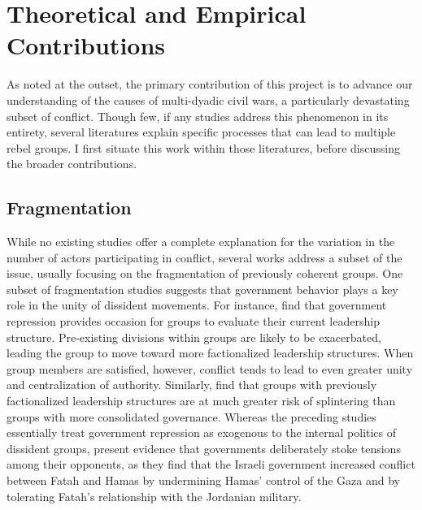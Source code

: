 
\section{Theoretical and Empirical Contributions}

As noted at the outset, the primary contribution of this project is to advance our understanding of the causes of multi-dyadic civil wars, a particularly devastating subset of conflict. Though few, if any studies address this phenomenon in its entirety, several literatures explain specific processes that can lead to multiple rebel groups. I first situate this work within those literatures, before discussing the broader contributions.

\subsection{Fragmentation}

While no existing studies offer a complete explanation for the variation in the number of actors participating in conflict, several works address a subset of the issue, usually focusing on the fragmentation of previously coherent groups. One subset of fragmentation studies suggests that government behavior plays a key role in the unity of dissident movements. For instance, \citet{McLauchlin2012} find that government repression provides occasion for groups to evaluate their current leadership structure. Pre-existing divisions within groups are likely to be exacerbated, leading the group to move toward more factionalized leadership structures. When group members are satisfied, however, conflict tends to lead to even greater unity and centralization of authority. Similarly, \citet{Asal2012} find that groups with previously factionalized leadership structures are at much greater risk of splintering than groups with more consolidated governance. Whereas the preceding studies essentially treat government repression as exogenous to the internal politics of dissident groups, \citet{Bhavnani2011} present evidence that governments deliberately stoke tensions among their opponents, as they find that the Israeli government increased conflict between Fatah and Hamas by undermining Hamas' control of the Gaza and by tolerating Fatah's relationship with the Jordanian military.


